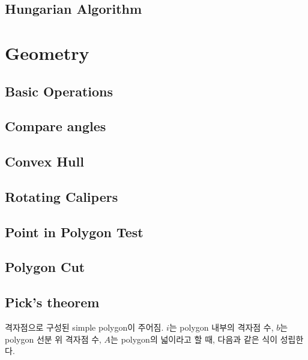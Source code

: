 \documentclass[10pt,landscape,a4paper,twocolumn]{article}
\begin{document}
\subsection{Hungarian Algorithm}


\section{Geometry}

\subsection{Basic Operations}


\subsection{Compare angles}


\subsection{Convex Hull}


\subsection{Rotating Calipers}


\subsection{Point in Polygon Test}


\subsection{Polygon Cut}


\subsection{Pick's theorem}

격자점으로 구성된 simple polygon이 주어짐. $i$는 polygon 내부의 격자점 수, $b$는 polygon 선분 위 격자점 수, $A$는 polygon의 넓이라고 할 때, 다음과 같은 식이 성립한다.
\end{document}
